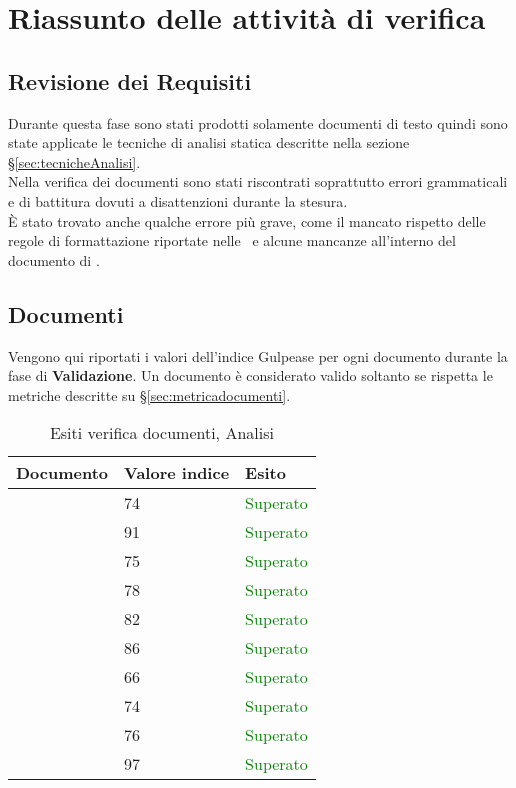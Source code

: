 \section{Riassunto delle attività di verifica}{
\subsection{Revisione dei Requisiti}{

Durante questa fase sono stati prodotti solamente documenti di testo quindi sono state applicate le tecniche di analisi statica descritte nella sezione \S\ref{sec:tecnicheAnalisi}.\\
Nella verifica dei documenti sono stati riscontrati soprattutto errori grammaticali e di battitura dovuti a disattenzioni durante la stesura.\\
È stato trovato anche qualche errore più grave, come il mancato rispetto delle regole di formattazione riportate nelle \NormeDiProgetto\ e alcune mancanze all'interno del documento di \AnalisiDeiRequisiti.\\
}
\subsection{Documenti}{
Vengono qui riportati i valori dell’indice Gulpease per ogni documento durante la fase di \textbf{Validazione}. Un documento è considerato valido soltanto se rispetta le metriche descritte su \S\ref{sec:metricadocumenti}.

\begin{table}[H]
	\centering
	\begin{tabular}{p{}p{}
			p{}}
		\toprule Documento & Valore indice & Esito \\
		\midrule
		\PianoDiProgetto & 74 & \textcolor{green}{Superato} \\
		\AnalisiDeiRequisiti & 91 & \textcolor{green}{Superato} \\
		\NormeDiProgetto & 75 & \textcolor{green}{Superato} \\
		\PianoDiQualifica & 78 & \textcolor{green}{Superato} \\
		\StudioDiFattibilita & 82 & \textcolor{green}{Superato} \\
		\SpecificaTecnica & 86 & \textcolor{green}{Superato}\\
		\ManualeUtente & 66 & \textcolor{green}{Superato}\\
		\ManualeAmministratore & 74 & \textcolor{green}{Superato}\\
		\DefinizioneDelProdotto & 76 & \textcolor{green}{Superato}\\
		\Glossario & 97 & \textcolor{green}{Superato} \\
		\bottomrule
	\end{tabular}
	\label{tab:costorequisiti}
	\caption{Esiti verifica documenti, Analisi}
\end{table}

}}
